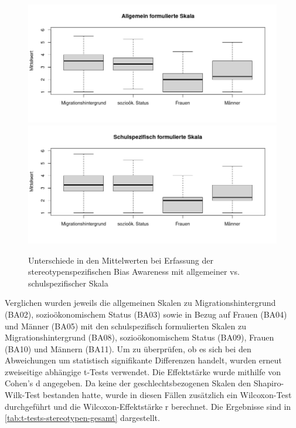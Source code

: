 \begin{figure}[h!]
	\includegraphics[width=\textwidth]{resources/boxplot-stereotypen-1-gesamt.png}
	\includegraphics[width=\textwidth]{resources/boxplot-stereotypen-2-gesamt.png}
	\caption{Unterschiede in den Mittelwerten bei Erfassung der stereotypenspezifischen Bias Awareness mit allgemeiner vs. schulspezifischer Skala}
	\label{fig:boxplot-stereotypen-gesamt}
\end{figure}

Verglichen wurden jeweils die allgemeinen Skalen zu Migrationshintergrund (BA02), sozioökonomischem Status (BA03) sowie in Bezug auf Frauen (BA04) und Männer (BA05) mit den schulspezifisch formulierten Skalen zu Migrationshintergrund (BA08), sozioökonomischem Status (BA09), Frauen (BA10) und Männern (BA11).
Um zu überprüfen, ob es sich bei den Abweichungen um statistisch signifikante Differenzen handelt, wurden erneut zweiseitige abhängige t-Tests verwendet.
Die Effektstärke wurde mithilfe von Cohen's d angegeben.
Da keine der geschlechtsbezogenen Skalen den Shapiro-Wilk-Test bestanden hatte, wurde in diesen Fällen zusätzlich ein Wilcoxon-Test durchgeführt und die Wilcoxon-Effektstärke r berechnet.
Die Ergebnisse sind in \autoref{tab:t-tests-stereotypen-gesamt} dargestellt.

